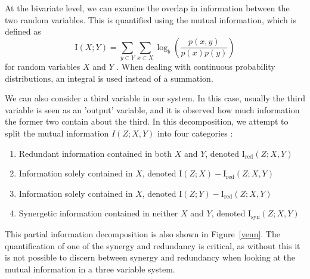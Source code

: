 \documentclass[../main.tex]{subfiles}
\begin{document}
At the bivariate level, we can examine the overlap in information between the two random variables.
This is quantified using the mutual information, which is defined as 
%
\begin{equation}
\label{MI}
\mathrm{I}(X;Y) = \sum_{y \subset Y} \sum_{x \subset X} \log_b (\frac{p(x,y)}{p(x) p(y)})
\end{equation}
%
for random variables $X$ and $Y$ \cite{cover2012elements}.
When dealing with continuous probability distributions, an integral is used instead of a summation.

We can also consider a third variable in our system.
In this case, usually the third variable is seen as an 'output' variable, and it is observed how much information the former two contain about the third.
In this decomposition, we attempt to split the mutual information $I(Z;X,Y)$ into four categories \cite{williams2010nonnegative}:
%
\begin{enumerate}
\item Redundant information contained in both $X$ and $Y$, denoted $\mathrm{I}_\mathrm{red}(Z;X,Y)$
\item Information solely contained in $X$, denoted $\mathrm{I}(Z; X) - \mathrm{I}_\mathrm{red}(Z;X,Y)$
\item Information solely contained in $X$, denoted $\mathrm{I}(Z; Y) - \mathrm{I}_\mathrm{red}(Z;X,Y)$
\item Synergetic information contained in neither $X$ and $Y$, denoted $\mathrm{I}_\mathrm{syn}(Z;X,Y)$
\end{enumerate}
This partial information decomposition is also shown in Figure~\ref{venn}.
The quantification of one of the synergy and redundancy is critical, as without this it is not possible to discern between synergy and redundancy when looking at the mutual information in a three variable system.

\def\firstcircle{(0:-0.9cm) circle (2cm)}
\def\secondcircle{(0:0cm) circle (3cm)}
\def\thirdcircle{(0:0.9cm) circle (2cm)}
\end{document}
